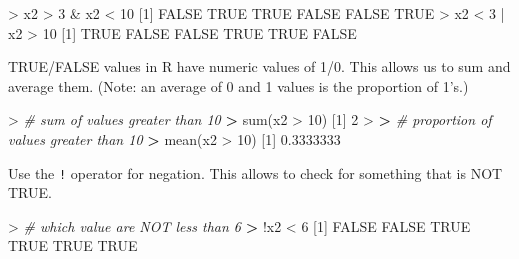 \documentclass[
]{book}
\newenvironment{Shaded}{\begin{snugshade}}{\end{snugshade}}
\newcommand{\CommentTok}[1]{\textcolor[rgb]{0.56,0.35,0.01}{\textit{#1}}}
\newcommand{\ConstantTok}[1]{\textcolor[rgb]{0.00,0.00,0.00}{#1}}
\newcommand{\DecValTok}[1]{\textcolor[rgb]{0.00,0.00,0.81}{#1}}
\newcommand{\ErrorTok}[1]{\textcolor[rgb]{0.64,0.00,0.00}{\textbf{#1}}}
\newcommand{\FloatTok}[1]{\textcolor[rgb]{0.00,0.00,0.81}{#1}}
\newcommand{\FunctionTok}[1]{\textcolor[rgb]{0.00,0.00,0.00}{#1}}
\newcommand{\NormalTok}[1]{#1}
\newcommand{\SpecialCharTok}[1]{\textcolor[rgb]{0.00,0.00,0.00}{#1}}
\begin{document}
\begin{Shaded}
\begin{Highlighting}[]
\SpecialCharTok{\textgreater{}}\NormalTok{ x2 }\SpecialCharTok{\textgreater{}} \DecValTok{3} \SpecialCharTok{\&}\NormalTok{ x2 }\SpecialCharTok{\textless{}} \DecValTok{10}
\NormalTok{[}\DecValTok{1}\NormalTok{] }\ConstantTok{FALSE}  \ConstantTok{TRUE}  \ConstantTok{TRUE} \ConstantTok{FALSE} \ConstantTok{FALSE}  \ConstantTok{TRUE}
\SpecialCharTok{\textgreater{}}\NormalTok{ x2 }\SpecialCharTok{\textless{}} \DecValTok{3} \SpecialCharTok{|}\NormalTok{ x2 }\SpecialCharTok{\textgreater{}} \DecValTok{10}
\NormalTok{[}\DecValTok{1}\NormalTok{]  }\ConstantTok{TRUE} \ConstantTok{FALSE} \ConstantTok{FALSE}  \ConstantTok{TRUE}  \ConstantTok{TRUE} \ConstantTok{FALSE}
\end{Highlighting}
\end{Shaded}

TRUE/FALSE values in R have numeric values of 1/0. This allows us to sum and average them. (Note: an average of 0 and 1 values is the proportion of 1's.)

\begin{Shaded}
\begin{Highlighting}[]
\SpecialCharTok{\textgreater{}} \CommentTok{\# sum of values greater than 10}
\ErrorTok{\textgreater{}} \FunctionTok{sum}\NormalTok{(x2 }\SpecialCharTok{\textgreater{}} \DecValTok{10}\NormalTok{)}
\NormalTok{[}\DecValTok{1}\NormalTok{] }\DecValTok{2}
\SpecialCharTok{\textgreater{}} 
\ErrorTok{\textgreater{}} \CommentTok{\# proportion of values greater than 10}
\ErrorTok{\textgreater{}} \FunctionTok{mean}\NormalTok{(x2 }\SpecialCharTok{\textgreater{}} \DecValTok{10}\NormalTok{)}
\NormalTok{[}\DecValTok{1}\NormalTok{] }\FloatTok{0.3333333}
\end{Highlighting}
\end{Shaded}

Use the \texttt{!} operator for negation. This allows to check for something that is NOT TRUE.

\begin{Shaded}
\begin{Highlighting}[]
\SpecialCharTok{\textgreater{}} \CommentTok{\# which value are NOT less than 6}
\ErrorTok{\textgreater{}} \SpecialCharTok{!}\NormalTok{x2 }\SpecialCharTok{\textless{}} \DecValTok{6}
\NormalTok{[}\DecValTok{1}\NormalTok{] }\ConstantTok{FALSE} \ConstantTok{FALSE}  \ConstantTok{TRUE}  \ConstantTok{TRUE}  \ConstantTok{TRUE}  \ConstantTok{TRUE}
\end{Highlighting}
\end{Shaded}
\end{document}
